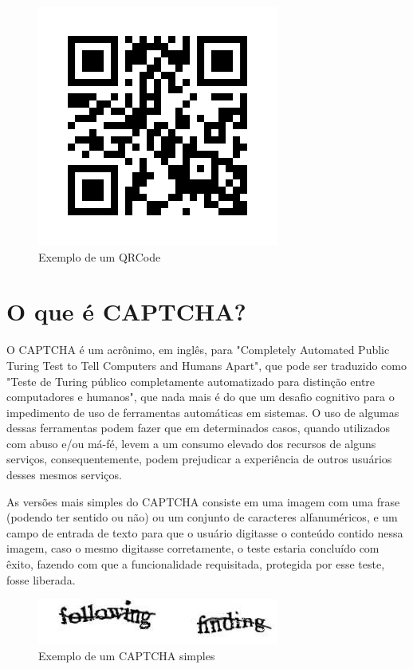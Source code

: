 \begin{figure}[h]
    \centering
    \includegraphics[scale=0.5]{tcc/figures/exemplo-qrcode.png}
    \caption{Exemplo de um QRCode}
    \label{fig-exemplo-qrcode}
\end{figure}

\section{O que é CAPTCHA?}

O CAPTCHA é um acrônimo, em inglês, para "Completely Automated Public Turing Test to Tell Computers and Humans Apart", que pode ser traduzido como "Teste de Turing público completamente automatizado para distinção entre computadores e humanos", que nada mais é do que um desafio cognitivo para o impedimento de uso de ferramentas automáticas em sistemas. O uso de algumas dessas ferramentas podem fazer que em determinados casos, quando utilizados com abuso e/ou má-fé, levem a um consumo elevado dos recursos de alguns serviços, consequentemente, podem prejudicar a experiência de outros usuários desses mesmos serviços.

As versões mais simples do CAPTCHA consiste em uma imagem com uma frase (podendo ter sentido ou não) ou um conjunto de caracteres alfanuméricos, e um campo de entrada de texto para que o usuário digitasse o conteúdo contido nessa imagem, caso o mesmo digitasse corretamente, o teste estaria concluído com êxito, fazendo com que a funcionalidade requisitada, protegida por esse teste, fosse liberada.

\begin{figure}[h]
    \centering
    \includegraphics[scale=0.5]{tcc/figures/captcha/captcha-frase.jpg}
    \caption{Exemplo de um CAPTCHA simples}
    \label{fig-exemplo-captcha-simples}
\end{figure}


